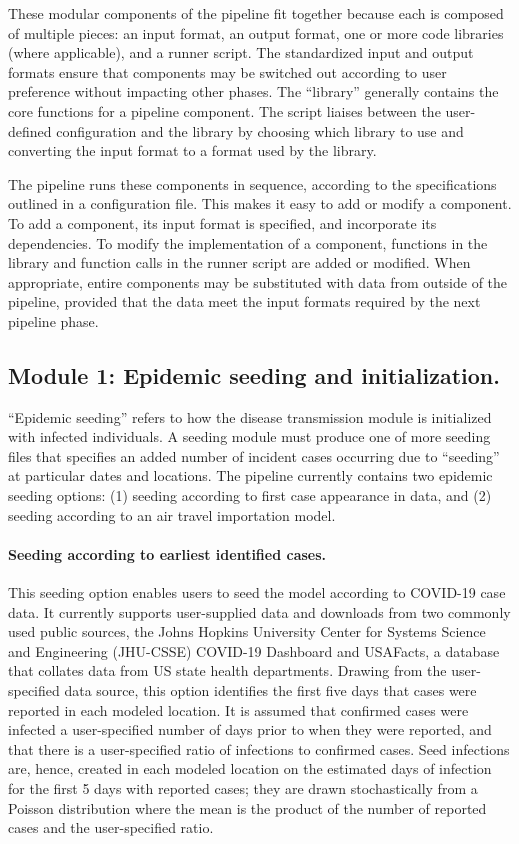 These modular components of the pipeline fit together because each is composed of multiple pieces: an input format, an output format, one or more code libraries (where applicable), and a runner script. The standardized input and output formats ensure that components may be switched out according to user preference without impacting other phases. The “library” generally contains the core functions for a pipeline component. The script liaises between the user-defined configuration and the library by choosing which library to use and converting the input format to a format used by the library. 

The pipeline runs these components in sequence, according to the specifications outlined in a configuration file. This makes it easy to add or modify a component. To add a component, its input format is specified, and incorporate its dependencies. To modify the implementation of a component, functions in the library and function calls in the runner script are added or modified. When appropriate, entire components may be substituted with data from outside of the pipeline, provided that the data meet the input formats required by the next pipeline phase.

\subsection{Module 1: Epidemic seeding and initialization.} 

“Epidemic seeding” refers to how the disease transmission module is initialized with infected individuals. A seeding module must produce one of more seeding files that specifies an added number of incident cases occurring due to “seeding” at particular dates and locations. The pipeline currently contains two epidemic seeding options: (1) seeding according to first case appearance in data, and (2) seeding according to an air travel importation model. 

\paragraph{Seeding according to earliest identified cases.} This seeding option enables users to seed the model according to COVID-19 case data. It currently supports user-supplied data and downloads from two commonly used public sources, the Johns Hopkins University Center for Systems Science and Engineering (JHU-CSSE) COVID-19 Dashboard\cite{Dong:InteractiveWebbasedDashboard:2020} and USAFacts, a database that collates data from US state health departments\cite{USAFacts:USCOVID19Cases:2021}. Drawing from the user-specified data source, this option identifies the first five days that cases were reported in each modeled location. It is assumed that confirmed cases were infected a user-specified number of days prior to when they were reported, and that there is a user-specified ratio of infections to confirmed cases. Seed infections are, hence, created in each modeled location on the estimated days of infection for the first 5 days with reported cases; they are drawn stochastically from a Poisson distribution where the mean is the product of the number of reported cases and the user-specified ratio. 

